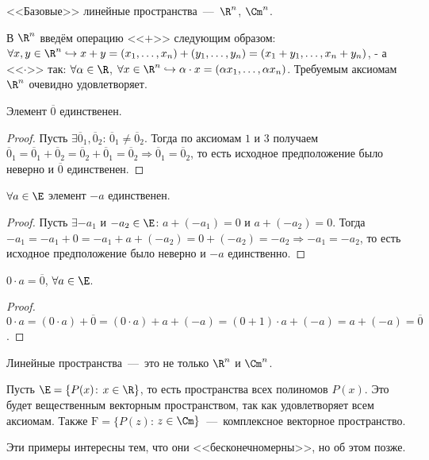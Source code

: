 \begin{examples}
    <<Базовые>> линейные пространства~---~$\R^n$, $\Cm^n$.

    В $\R^n$ введём операцию <<$+$>> следующим образом: $\forall x, y \in \R^n \hookrightarrow x + y = (x_1, \ldots, x_n) + (y_1, \ldots, y_n) = (x_1 + y_1, \ldots, x_n + y_n)$, - а <<$\cdot$>> так: $\forall \alpha \in \R$, $\forall x \in \R^n \hookrightarrow \alpha \cdot x = (\alpha x_1, \ldots, \alpha x_n)$. Требуемым аксиомам $\R^n$ очевидно удовлетворяет.
\end{examples}
\begin{proposition}
    Элемент $\overline{0}$ единственен.
\end{proposition}
\begin{proof}
    Пусть $\exists \overline{0}_{1}, \overline{0}_{2}$: $\overline{0}_{1} \neq \overline{0}_{2}$. Тогда по аксиомам $1$ и $3$ получаем $\overline{0}_{1} = \overline{0}_{1} + \overline{0}_{2} = \overline{0}_{2} + \overline{0}_{1} = \overline{0}_{2} \Rightarrow \overline{0}_{1} = \overline{0}_{2}$, то есть исходное предположение было неверно и $\overline{0}$ единственен.
\end{proof}
\begin{proposition}
    $\forall a \in \E$ элемент $-a$ единственен.
\end{proposition}
\begin{proof}
    Пусть $\exists -a_{1}$ и $-a_{2} \in \E$: $a + (-a_{1}) = 0$ и $a + (-a_{2}) = 0$. Тогда $-a_{1} = -a_{1} + 0 = -a_{1} + a + (-a_{2}) = 0 + (-a_{2}) = -a_{2} \Rightarrow -a_{1} = -a_{2}$, то есть исходное предположение было неверно и $-a$ единственно.
\end{proof}
\begin{proposition}
    $0 \cdot a = \overline{0}$, $\forall a \in \E$.
\end{proposition}
\begin{proof}
    $0 \cdot a = (0 \cdot a) + \overline{0} = (0 \cdot a) + a + (-a) = (0 + 1) \cdot a + (-a) = a + (-a) = \overline{0}$.
\end{proof}

Линейные пространства~---~это не только $\R^n$ и $\Cm^n$.
\begin{examples}
    Пусть $\E = \{ P (x)$: $x \in \R\}$, то есть пространства всех полиномов $P(x)$. Это будет вещественным векторным пространством, так как удовлетворяет всем аксиомам. Также $\text{F} = \{ P(z)$: $z \in \Cm\}$~---~комплексное векторное пространство.
\end{examples}
\begin{note}
    Эти примеры интересны тем, что они <<бесконечномерны>>, но об этом позже.
\end{note}

